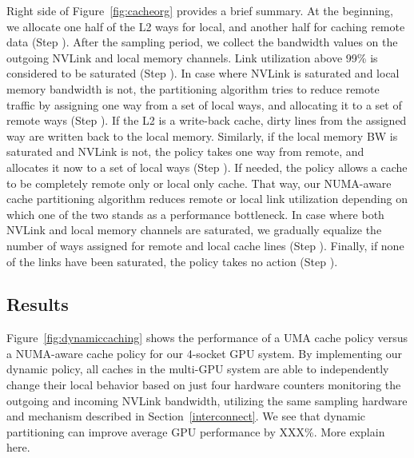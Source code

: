 Right side of Figure~\ref{fig:cacheorg} provides a brief summary. At the beginning, 
we allocate one half of the L2 ways for local, and another half for caching 
remote data (Step ). After the sampling period, we collect the 
bandwidth values on the outgoing NVLink and local memory channels. Link 
utilization above 99\% is considered to be saturated (Step ). 
In case where NVLink is saturated and local memory bandwidth is not, the 
partitioning algorithm tries to reduce remote traffic by assigning one way 
from a set of local ways, and allocating it to a set of remote ways 
(Step ). If the L2 is a write-back cache, dirty lines from the 
assigned way are written back to the local memory. Similarly, if the local 
memory BW is saturated and NVLink is not, the policy takes one way from 
remote, and allocates it now to a set of local ways (Step ). 
If needed, the policy allows a cache to be completely remote only or local 
only cache. That way, our NUMA-aware cache partitioning algorithm reduces 
remote or local link utilization depending on which one of the two stands as 
a performance bottleneck. In case where both NVLink and local memory channels 
are saturated, we gradually equalize the number of ways assigned for remote 
and local cache lines (Step ). Finally, if none of the links have 
been saturated, the policy takes no action (Step ). 

\subsection{Results}

Figure~\ref{fig:dynamiccaching} shows the performance of a UMA cache policy versus
a NUMA-aware cache policy for our 4-socket GPU system.  By implementing our dynamic
policy, all caches in the multi-GPU system are able to independently change their local
behavior based on just four hardware counters monitoring the outgoing and incoming
NVLink bandwidth, utilizing the same sampling hardware and mechanism described in 
Section~\ref{interconnect}.  We see that dynamic partitioning can improve average GPU
performance by XXX\%.  More explain here.

